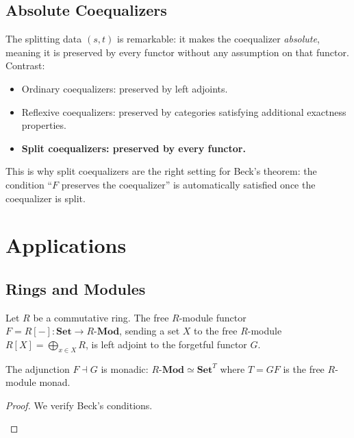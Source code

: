 \subsection{Absolute Coequalizers}

The splitting data $(s,t)$ is remarkable: it makes the coequalizer
\emph{absolute}, meaning it is preserved by every functor without any
assumption on that functor. Contrast:
\begin{itemize}
  \item Ordinary coequalizers: preserved by left adjoints.
  \item Reflexive coequalizers: preserved by categories satisfying
        additional exactness properties.
  \item \textbf{Split coequalizers: preserved by every functor.}
\end{itemize}
This is why split coequalizers are the right setting for Beck's theorem:
the condition ``$F$ preserves the coequalizer'' is automatically satisfied
once the coequalizer is split.


\section{Applications}
\label{sec:monads-applications}

\subsection{Rings and Modules}

Let $R$ be a commutative ring. The free $R$-module functor
$F = R[-] : \mathbf{Set} \to R\text{-}\mathbf{Mod}$, sending a set $X$
to the free $R$-module $R[X] = \bigoplus_{x \in X} R$, is left adjoint to
the forgetful functor $G$.

\begin{theorem}
The adjunction $F \dashv G$ is monadic: $R\text{-}\mathbf{Mod} \simeq
\mathbf{Set}^T$ where $T = GF$ is the free $R$-module monad.
\end{theorem}

\begin{proof}
We verify Beck's conditions.
\begin{prooflog}
\end{prooflog}
\end{proof}

